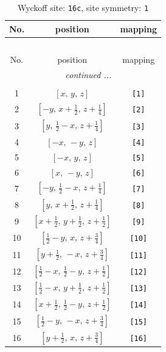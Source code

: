 \documentclass[fleqn,8pt]{jsarticle}
\begin{document}
\begin{longtable}{ccc}
\caption{Wyckoff site: {\tt 16c}, site symmetry: {\tt 1}}
 \\
 \hline \hline
No. & position & mapping \\ \hline \endfirsthead

\multicolumn{2}{l}{\tablename\ \thetable{}} \\
 \hline \hline
No. & position & mapping \\ \hline \endhead

 \hline \hline
\multicolumn{2}{r}{\footnotesize\it continued ...} \\ \endfoot

 \hline \hline
\multicolumn{2}{r}{} \\ \endlastfoot

1 & $\left[ x,\, y,\, z \right]$ & {\tt [1]} \\ \hline
2 & $\left[ - y,\, x + \frac{1}{2},\, z + \frac{1}{4} \right]$ & {\tt [2]} \\ \hline
3 & $\left[ y,\, \frac{1}{2} - x,\, z + \frac{1}{4} \right]$ & {\tt [3]} \\ \hline
4 & $\left[ - x,\, - y,\, z \right]$ & {\tt [4]} \\ \hline
5 & $\left[ - x,\, y,\, z \right]$ & {\tt [5]} \\ \hline
6 & $\left[ x,\, - y,\, z \right]$ & {\tt [6]} \\ \hline
7 & $\left[ - y,\, \frac{1}{2} - x,\, z + \frac{1}{4} \right]$ & {\tt [7]} \\ \hline
8 & $\left[ y,\, x + \frac{1}{2},\, z + \frac{1}{4} \right]$ & {\tt [8]} \\ \hline
9 & $\left[ x + \frac{1}{2},\, y + \frac{1}{2},\, z + \frac{1}{2} \right]$ & {\tt [9]} \\ \hline
10 & $\left[ \frac{1}{2} - y,\, x,\, z + \frac{3}{4} \right]$ & {\tt [10]} \\ \hline
11 & $\left[ y + \frac{1}{2},\, - x,\, z + \frac{3}{4} \right]$ & {\tt [11]} \\ \hline
12 & $\left[ \frac{1}{2} - x,\, \frac{1}{2} - y,\, z + \frac{1}{2} \right]$ & {\tt [12]} \\ \hline
13 & $\left[ \frac{1}{2} - x,\, y + \frac{1}{2},\, z + \frac{1}{2} \right]$ & {\tt [13]} \\ \hline
14 & $\left[ x + \frac{1}{2},\, \frac{1}{2} - y,\, z + \frac{1}{2} \right]$ & {\tt [14]} \\ \hline
15 & $\left[ \frac{1}{2} - y,\, - x,\, z + \frac{3}{4} \right]$ & {\tt [15]} \\ \hline
16 & $\left[ y + \frac{1}{2},\, x,\, z + \frac{3}{4} \right]$ & {\tt [16]} \\
\end{longtable}
\end{document}
